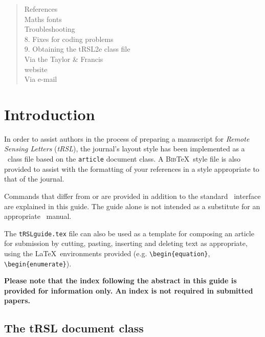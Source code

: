 \documentclass[]{tRSL2e}
\begin{document}
\begin{abstract}
{{\hspace*{10pt}{6.2.}   References \\
\hspace*{10pt}{6.3.}   Maths fonts\\
   Troubleshooting\\
{8.}   Fixes for coding problems\\
{9.}   Obtaining the tRSL2e class file\\
\hspace*{10pt}{9.1}  Via the Taylor \& Francis \\
\hspace*{24pt}                 website\\
\hspace*{10pt}{9.2}   Via e-mail\\
      }}
\end{abstract}


\section{Introduction}

In order to assist authors in the process of preparing a manuscript for {\itshape Remote Sensing Letters} ({\it tRSL}), the journal's layout style has been implemented as a \LaTeXe\ class file based on the {\tt article} document class. A \textsc{Bib}\TeX\ style file is also provided to assist with the formatting of your references in a style appropriate to that of the journal.

Commands that differ from or are provided in addition to the standard \LaTeXe\ interface are explained in this guide. The guide alone is not intended as a substitute for an appropriate \LaTeXe\ manual.

The \texttt{tRSLguide.tex} file can also be used as a template for composing an article for submission by cutting, pasting, inserting and
deleting text as appropriate, using the \LaTeX\ environments provided (e.g. \verb"\begin{equation}",
\verb"\begin{enumerate}").

{\bf{Please note that the index following the abstract in this guide is provided for information only. An index is not required in submitted papers.}}


\subsection{The {\bi tRSL} document class}
\end{document}
